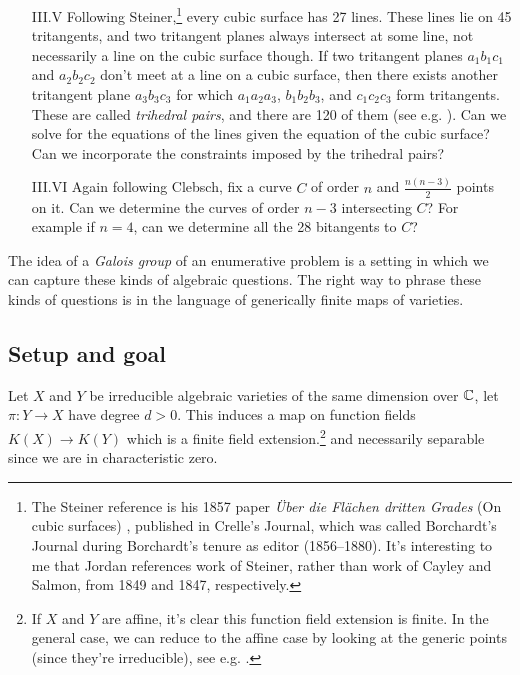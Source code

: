 \documentclass[11pt]{amsart}
\begin{document}
\begin{itemize}
    \item[III.V] Following Steiner,\footnote{%
    The Steiner reference is his 1857 paper \textit{Über die Flächen dritten Grades} (On cubic surfaces) \cite{Steiner-cubic-surfaces}, published in Crelle's Journal, which was called Borchardt's Journal during Borchardt's tenure as editor (1856--1880). It's interesting to me that Jordan references work of Steiner, rather than work of Cayley and Salmon, from 1849 and 1847, respectively.} every cubic surface has 27 lines. These lines lie on 45 tritangents, and two tritangent planes always intersect at some line, not necessarily a line on the cubic surface though. If two tritangent planes $a_1b_1c_1$ and $a_2b_2c_2$ don't meet at a line on a cubic surface, then there exists another tritangent plane $a_3b_3c_3$ for which $a_1a_2a_3$, $b_1b_2b_3$, and $c_1c_2c_3$ form tritangents. These are called \textit{trihedral pairs}, and there are 120 of them (see e.g. \cite[p.~112]{Hunt}). Can we solve for the equations of the lines given the equation of the cubic surface? Can we incorporate the constraints imposed by the trihedral pairs?

    \item[III.VI] Again following Clebsch, fix a curve $C$ of order $n$ and $\frac{n(n-3)}{2}$ points on it. Can we determine the curves of order $n-3$ intersecting $C$? For example if $n=4$, can we determine all the 28 bitangents to $C$?
\end{itemize}

The idea of a \textit{Galois group} of an enumerative problem is a setting in which we can capture these kinds of algebraic questions. The right way to phrase these kinds of questions is in the language of generically finite maps of varieties.

\subsection{Setup and goal}

Let $X$ and $Y$ be irreducible algebraic varieties of the same dimension over $\mathbb{C}$, let $\pi \colon Y \to X$ have degree $d>0$. This induces a map on function fields $K(X) \to K(Y)$ which is a finite field extension.\footnote{If $X$ and $Y$ are affine, it's clear this function field extension is finite. In the general case, we can reduce to the affine case by looking at the generic points (since they're irreducible), see e.g. \cite[02NW]{Stacks}.} and necessarily separable since we are in characteristic zero.
\end{document}
